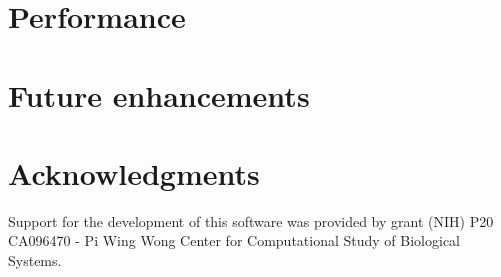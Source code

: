 \documentclass[applications]{gen-bioinformatics}
\begin{document}
\section*{Performance}

\section*{Future enhancements}

\section*{Acknowledgments}
Support for the development of this software was provided by grant
(NIH) P20 CA096470 - Pi Wing Wong Center for Computational Study of
Biological Systems.

\end{document}
